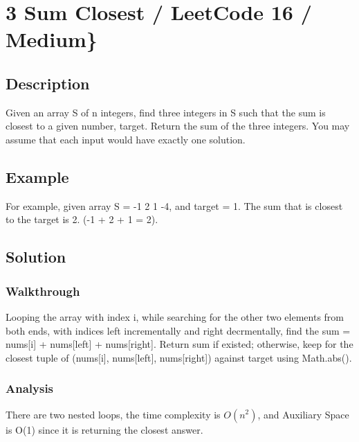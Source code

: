 \documentclass[]{book}
\begin{document}
\hypertarget{sum-closest-leetcode-16-medium}{%
\section{3 Sum Closest / LeetCode 16 / Medium\}}\label{sum-closest-leetcode-16-medium}}

\hypertarget{description-6}{%
\subsection{Description}\label{description-6}}

Given an array S of n integers, find three integers in S such that the sum is closest to a given number, target.
Return the sum of the three integers. You may assume that each input would have exactly one solution.

\hypertarget{example-5}{%
\subsection{Example}\label{example-5}}

For example, given array S = -1 2 1 -4, and target = 1.
The sum that is closest to the target is 2. (-1 + 2 + 1 = 2).

\hypertarget{solution-5}{%
\subsection{Solution}\label{solution-5}}

\hypertarget{walkthrough-7}{%
\subsubsection{Walkthrough}\label{walkthrough-7}}

Looping the array with index i, while searching for the other two elements from both ends, with indices
left incrementally and right decrmentally, find the sum = nums{[}i{]} + nums{[}left{]} + nums{[}right{]}. Return sum if existed;
otherwise, keep for the closest tuple of (nums{[}i{]}, nums{[}left{]}, nums{[}right{]}) against target using Math.abs().

\hypertarget{analysis-7}{%
\subsubsection{Analysis}\label{analysis-7}}

There are two nested loops, the time complexity is \(O(n^2)\), and Auxiliary Space is O(1) since it is returning the closest answer.
\end{document}
